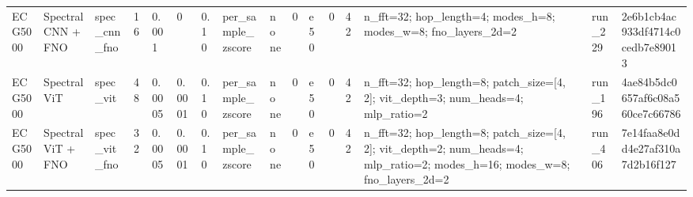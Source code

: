 \begin{table}
\begin{tabular}{llllllllllllllll}
ECG5000 & Spectral CNN + FNO & spec\_cnn\_fno & 16 & 0.001 & 0 & 0.10 & per\_sample\_zscore & none & 0 & e50 & 0 & 42 & n\_fft=32; hop\_length=4; modes\_h=8; modes\_w=8; fno\_layers\_2d=2 & run\_229 & 2e6b1cb4ac933df4714c0cedb7e89013 \\
ECG5000 & Spectral ViT & spec\_vit & 48 & 0.0005 & 0.0001 & 0.10 & per\_sample\_zscore & none & 0 & e50 & 0 & 42 & n\_fft=32; hop\_length=8; patch\_size=[4, 2]; vit\_depth=3; num\_heads=4; mlp\_ratio=2 & run\_196 & 4ae84b5dc0657af6c08a560ce7c66786 \\
ECG5000 & Spectral ViT + FNO & spec\_vit\_fno & 32 & 0.0005 & 0.0001 & 0.10 & per\_sample\_zscore & none & 0 & e50 & 0 & 42 & n\_fft=32; hop\_length=8; patch\_size=[4, 2]; vit\_depth=2; num\_heads=4; mlp\_ratio=2; modes\_h=16; modes\_w=8; fno\_layers\_2d=2 & run\_406 & 7e14faa8e0dd4e27af310a7d2b16f127 \\
\bottomrule
\end{tabular}
\end{table}
